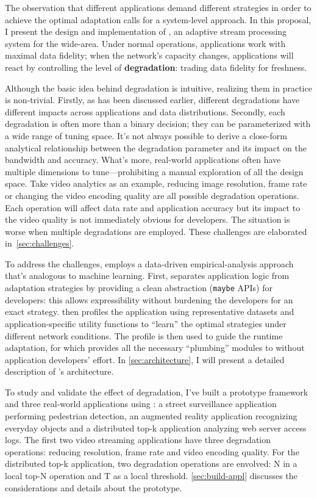 \documentclass[thesis.tex]{subfiles}
\begin{document}
The observation that different applications demand different strategies in order
to achieve the optimal adaptation calls for a system-level approach. In this
proposal, I present the design and implementation of \sysname{}, an adaptive
stream processing system for the wide-area. Under normal operations, \sysname{}
applications work with maximal data fidelity; when the network's capacity
changes, applications will react by controlling the level of
\textbf{degradation}: trading data fidelity for freshness.

Although the basic idea behind degradation is intuitive, realizing them in
practice is non-trivial. Firstly, as has been discussed earlier, different
degradations have different impacts across applications and data
distributions. Secondly, each degradation is often more than a binary decision;
they can be parameterized with a wide range of tuning space. It's not always
possible to derive a close-form analytical relationship between the degradation
parameter and its impact on the bandwidth and accuracy. What's more, real-world
applications often have multiple dimensions to tune---prohibiting a manual
exploration of all the design space. Take video analytics as an example,
reducing image resolution, frame rate or changing the video encoding quality are
all possible degradation operations. Each operation will affect data rate and
application accuracy but its impact to the video quality is not immediately
obvious for developers. The situation is worse when multiple degradations are
employed. These challenges are elaborated in~\autoref{sec:challenges}.

To address the challenges, \sysname{} employs a data-driven empirical-analysis
approach that's analogous to machine learning.  First, \sysname{} separates
application logic from adaptation strategies by providing a clean abstraction
(\texttt{maybe} APIs) for developers: this allows expressibility without
burdening the developers for an exact strategy. \sysname{} then profiles the
application using representative datasets and application-specific utility
functions to ``learn'' the optimal strategies under different network
conditions. The profile is then used to guide the runtime adaptation, for which
\sysname{} provides all the necessary ``plumbing'' modules to without
application developers' effort. In \autoref{sec:architecture}, I will present a
detailed description of \sysname{}'s architecture.

To study and validate the effect of degradation, I've built a prototype
framework and three real-world applications using \sysname{}: a street
surveillance application performing pedestrian detection, an augmented reality
application recognizing everyday objects and a distributed top-k application
analyzing web server access logs. The first two video streaming applications
have three degradation operations: reducing resolution, frame rate and video
encoding quality. For the distributed top-k application, two degradation
operations are envolved: N in a local top-N operation and T as a local
threshold. \autoref{sec:build-appl} discusses the considerations and details
about the prototype.
\end{document}
